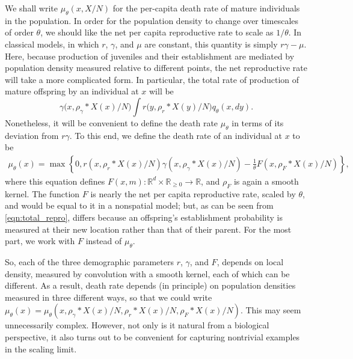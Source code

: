 \documentclass[12pt]{article}
\newcommand{\IR}{\mathbb R}
\newcommand{\kernel}{\rho}  %
\newcommand{\smooth}[1]{\kernel_{#1} \! * \!}  %
\numberwithin{equation}{section}
\begin{document}
We shall write $\mu_\theta(x, X/N)$ for the per-capita death rate of mature individuals
in the population.
In order for the 
population density to change over timescales of order $\theta$, we should like the net 
per capita reproductive rate 
to scale as $1/\theta$. 
In classical models, in which $r$, $\gamma$, and $\mu$ are constant, 
this quantity is simply $r\gamma -\mu$. 
Here, because production of juveniles and their establishment are
mediated by population density measured relative to different points, 
the net reproductive rate will take a more complicated form. 
In particular, the total rate of production of mature offspring by an individual at $x$ will be
\begin{equation} \label{eqn:total_repro}
	\gamma\big(x,\smooth{\gamma}X(x)/N\big)\int r\big(y, \smooth{r}X(y)/N\big)q_{\theta}(x,dy).
\end{equation}
Nonetheless, it will be convenient to define the death rate $\mu_\theta$ in terms of 
its deviation from $r\gamma$. 
To this end, we define
the death rate of an individual at $x$ to be
\begin{align} \label{eqn:mu_defn}
    \mu_\theta(x)
    =
    \max\left\{0, 
        r(x, \smooth{r} X(x) / N) \gamma(x, \smooth{\gamma} X(x) / N)
        - \frac{1}{\theta} F(x, \smooth{F} X(x) / N)
    \right\} ,
\end{align}
where this equation defines $F(x, m) : \IR^d \times \IR_{\ge 0} \to \IR$,
and $\rho_F$ is again a smooth kernel. 
The function $F$ is nearly
the net per capita reproductive rate, scaled by $\theta$,
and would be equal to it in a nonspatial model;
but, as can be seen from \eqref{eqn:total_repro},
differs because an offspring's establishment probability is measured at their new location
rather than that of their parent.
For the most part, we work with $F$ instead of $\mu_\theta$.

So, each of the three demographic parameters $r$, $\gamma$, and $F$,
depends on local density, measured by convolution with a smooth kernel,
each of which can be different.
As a result, death rate depends (in principle) on population densities measured in 
three different ways, 
so that we could write 
$\mu_\theta(x) = \mu_\theta(x, \smooth{\gamma} X(x) / N, \smooth{r} X(x) / N, \smooth{F} X(x) / N)$.
This may seem unnecessarily complex.
However, not only is it natural from a 
biological perspective, it also turns out to be convenient for
capturing nontrivial examples in the scaling limit.
\end{document}
